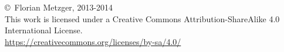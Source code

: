 \newpage
\thispagestyle{empty}
\vfill
\begin{center}
\copyright~Florian Metzger, 2013-2014\\
This work is licensed under a Creative Commons Attribution-ShareAlike 4.0 International License.\\
\url{https://creativecommons.org/licenses/by-sa/4.0/}
\vskip 0.5cm
\ccbysa
\end{center}
